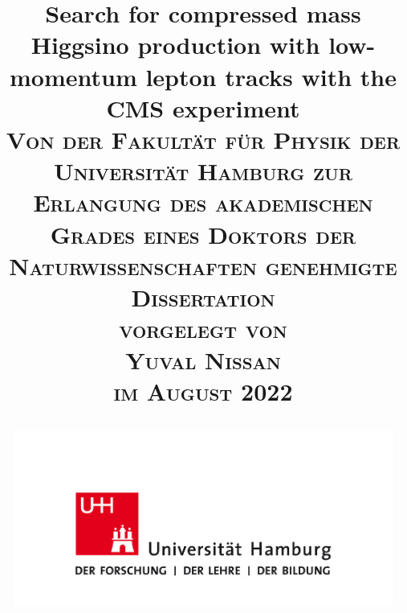 \documentclass[12pt,a4paper]{book}
\begin{document}
\frontmatter

\thispagestyle{empty}

\title{
        \LARGE \textbf{Search for compressed mass Higgsino production with low-momentum
lepton tracks with the CMS experiment} \\[1.2cm]
        {\large\textsc{
		Von der Fakult\"at für Physik
		der Universit\"at Hamburg zur Erlangung des akademischen Grades eines
		Doktors der Naturwissenschaften genehmigte Dissertation
		\\[1.2cm]
		vorgelegt von
		\\[1.2cm]
		Yuval Nissan\\
		im August 2022
        }}
\vfill
\begin{center}
        \includegraphics[width=125mm]{uhh-logo.png}
\end{center}        
        
}
\author{}
\date{}
\maketitle


\thispagestyle{empty}


\thispagestyle{empty}
\null\vfill


\pagebreak

\tableofcontents

\mainmatter











\listoffixmes
\printglossaries


\backmatter
\newpage{}

 
\listoffigures
\listoftables
\end{document}
